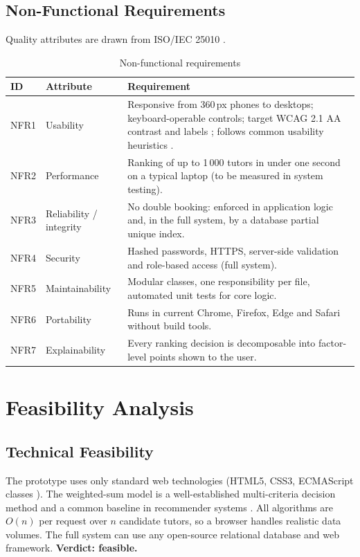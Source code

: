 \documentclass[11pt,a4paper]{article}
\begin{document}
\subsection{Non-Functional Requirements}
Quality attributes are drawn from ISO/IEC 25010 \cite{iso25010}.
\begin{table}[H]
\centering
\caption{Non-functional requirements}
\small
\begin{tabularx}{\linewidth}{@{}l l X@{}}
\toprule
\textbf{ID} & \textbf{Attribute} & \textbf{Requirement}\\ \midrule
NFR1 & Usability & Responsive from 360\,px phones to desktops; keyboard-operable controls; target WCAG 2.1 AA contrast and labels \cite{wcag21}; follows common usability heuristics \cite{nielsen1994}.\\
NFR2 & Performance & Ranking of up to 1\,000 tutors in under one second on a typical laptop (to be measured in system testing).\\
NFR3 & Reliability / integrity & No double booking: enforced in application logic and, in the full system, by a database partial unique index.\\
NFR4 & Security & Hashed passwords, HTTPS, server-side validation and role-based access (full system).\\
NFR5 & Maintainability & Modular classes, one responsibility per file, automated unit tests for core logic.\\
NFR6 & Portability & Runs in current Chrome, Firefox, Edge and Safari without build tools.\\
NFR7 & Explainability & Every ranking decision is decomposable into factor-level points shown to the user.\\
\bottomrule
\end{tabularx}
\end{table}

\section{Feasibility Analysis}
\subsection{Technical Feasibility}
The prototype uses only standard web technologies (HTML5, CSS3, ECMAScript classes \cite{ecma262}). The weighted-sum model is a well-established multi-criteria decision method \cite{triantaphyllou2000} and a common baseline in recommender systems \cite{ricci2022}. All algorithms are $O(n)$ per request over $n$ candidate tutors, so a browser handles realistic data volumes. The full system can use any open-source relational database and web framework. \textbf{Verdict: feasible.}
\end{document}
